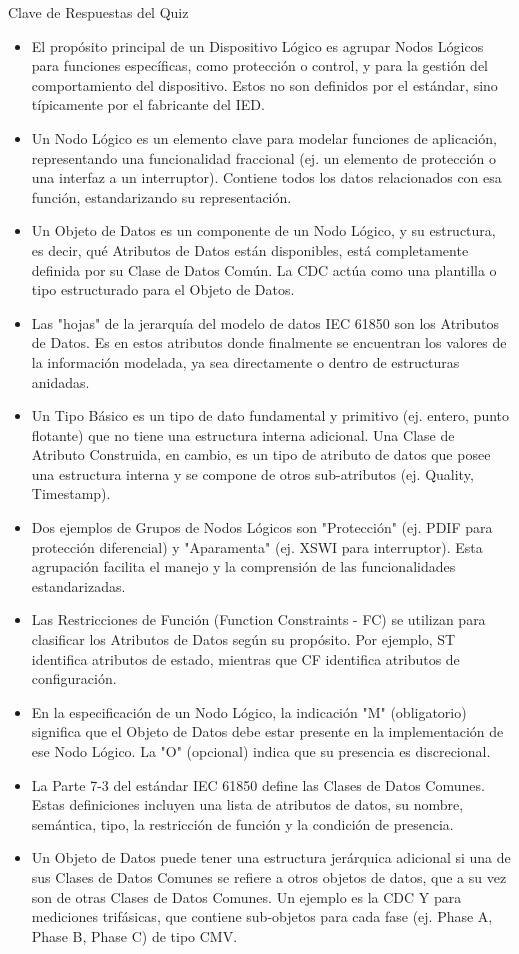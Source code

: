 \documentclass[a5paper]{book}%
\begin{document}
Clave de Respuestas del Quiz

\begin{itemize}
\item El propósito principal de un Dispositivo Lógico es agrupar Nodos Lógicos para funciones específicas, como protección o control, y para la gestión del comportamiento del dispositivo. Estos no son definidos por el estándar, sino típicamente por el fabricante del IED.
\item Un Nodo Lógico es un elemento clave para modelar funciones de aplicación, representando una funcionalidad fraccional (ej. un elemento de protección o una interfaz a un interruptor). Contiene todos los datos relacionados con esa función, estandarizando su representación.
\item Un Objeto de Datos es un componente de un Nodo Lógico, y su estructura, es decir, qué Atributos de Datos están disponibles, está completamente definida por su Clase de Datos Común. La CDC actúa como una plantilla o tipo estructurado para el Objeto de Datos.
\item Las "hojas" de la jerarquía del modelo de datos IEC 61850 son los Atributos de Datos. Es en estos atributos donde finalmente se encuentran los valores de la información modelada, ya sea directamente o dentro de estructuras anidadas.
\item Un Tipo Básico es un tipo de dato fundamental y primitivo (ej. entero, punto flotante) que no tiene una estructura interna adicional. Una Clase de Atributo Construida, en cambio, es un tipo de atributo de datos que posee una estructura interna y se compone de otros sub-atributos (ej. Quality, Timestamp).
\item Dos ejemplos de Grupos de Nodos Lógicos son "Protección" (ej. PDIF para protección diferencial) y "Aparamenta" (ej. XSWI para interruptor). Esta agrupación facilita el manejo y la comprensión de las funcionalidades estandarizadas.
\item Las Restricciones de Función (Function Constraints - FC) se utilizan para clasificar los Atributos de Datos según su propósito. Por ejemplo, ST identifica atributos de estado, mientras que CF identifica atributos de configuración.
\item En la especificación de un Nodo Lógico, la indicación "M" (obligatorio) significa que el Objeto de Datos debe estar presente en la implementación de ese Nodo Lógico. La "O" (opcional) indica que su presencia es discrecional.
\item La Parte 7-3 del estándar IEC 61850 define las Clases de Datos Comunes. Estas definiciones incluyen una lista de atributos de datos, su nombre, semántica, tipo, la restricción de función y la condición de presencia.
\item Un Objeto de Datos puede tener una estructura jerárquica adicional si una de sus Clases de Datos Comunes se refiere a otros objetos de datos, que a su vez son de otras Clases de Datos Comunes. Un ejemplo es la CDC Y para mediciones trifásicas, que contiene sub-objetos para cada fase (ej. Phase A, Phase B, Phase C) de tipo CMV.
\end{itemize}
\end{document}
